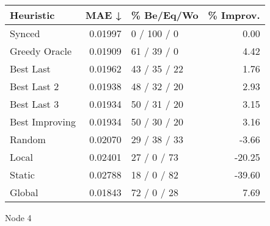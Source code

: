 \begin{tabular}{lrlr}
\toprule
\textbf{Heuristic} & \textbf{MAE ↓} & \textbf{\% Be/Eq/Wo} & \textbf{\% Improv.} \\
\midrule
            Synced &        0.01997 &          0 / 100 / 0 &                0.00 \\
     Greedy Oracle &        0.01909 &          61 / 39 / 0 &                4.42 \\
         Best Last &        0.01962 &         43 / 35 / 22 &                1.76 \\
       Best Last 2 &        0.01938 &         48 / 32 / 20 &                2.93 \\
       Best Last 3 &        0.01934 &         50 / 31 / 20 &                3.15 \\
    Best Improving &        0.01934 &         50 / 30 / 20 &                3.16 \\
            Random &        0.02070 &         29 / 38 / 33 &               -3.66 \\
             Local &        0.02401 &          27 / 0 / 73 &              -20.25 \\
            Static &        0.02788 &          18 / 0 / 82 &              -39.60 \\
            Global &        0.01843 &          72 / 0 / 28 &                7.69 \\
\bottomrule
\end{tabular}
\caption{Node 4}
\label{tab:iid_lr05_le2_bs2_4}
